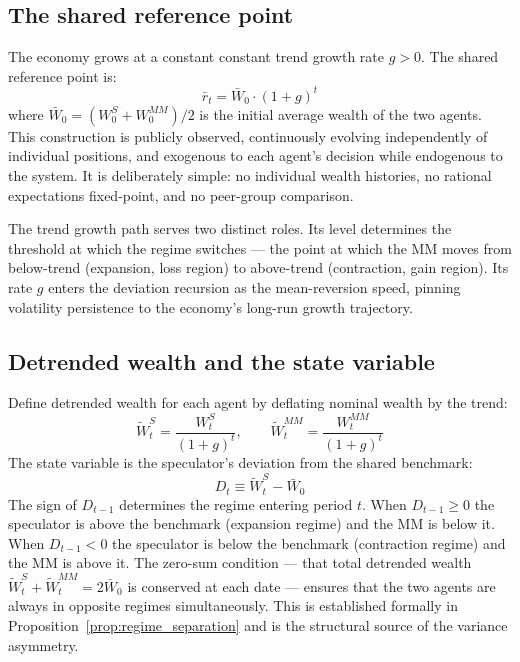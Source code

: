 \documentclass[12pt,a4paper]{article}
\theoremstyle{definition}
\begin{document}
\subsection{The shared reference point}
\label{sec:reference}

The economy grows at a constant constant trend growth rate $g > 0$. The shared
reference point is:
\begin{equation}
  \bar{r}_t = \bar{W}_0 \cdot (1+g)^t
  \label{eq:reference}
\end{equation}
where $\bar{W}_0 = (W^S_0 + W^{MM}_0)/2$ is the initial average wealth
of the two agents. This construction is publicly observed, continuously
evolving independently of individual positions, and exogenous to each
agent's decision while endogenous to the system. It is deliberately simple:
no individual wealth histories, no rational expectations fixed-point, and
no peer-group comparison.

The trend growth path serves two distinct roles. Its level
determines the threshold at which the regime switches --- the point at
which the MM moves from below-trend (expansion, loss region) to above-trend
(contraction, gain region). Its rate $g$ enters the deviation recursion as
the mean-reversion speed, pinning volatility persistence to the economy's
long-run growth trajectory.

\subsection{Detrended wealth and the state variable}
\label{sec:detrended}

Define detrended wealth for each agent by deflating nominal wealth by
the trend:
\begin{equation}
  \tilde{W}^S_t = \frac{W^S_t}{(1+g)^t}, \qquad
  \tilde{W}^{MM}_t = \frac{W^{MM}_t}{(1+g)^t}
\end{equation}
The state variable is the speculator's deviation from the shared benchmark:
\begin{equation}
  D_t \equiv \tilde{W}^S_t - \bar{W}_0
\end{equation}
The sign of $D_{t-1}$ determines the regime entering period $t$. When
$D_{t-1} \geq 0$ the speculator is above the benchmark (expansion regime)
and the MM is below it. When $D_{t-1} < 0$ the speculator is below the
benchmark (contraction regime) and the MM is above it. The zero-sum condition
--- that total detrended wealth $\tilde{W}^S_t + \tilde{W}^{MM}_t =
2\bar{W}_0$ is conserved at each date --- ensures that the two agents are
always in opposite regimes simultaneously. This is established formally in
Proposition~\ref{prop:regime_separation} and is the structural source of
the variance asymmetry.
\end{document}
